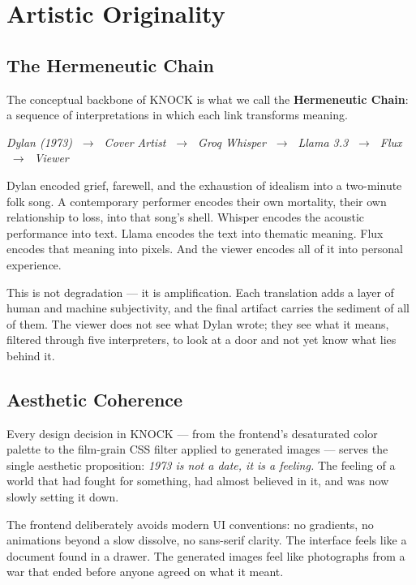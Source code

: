 \documentclass[12pt, a4paper]{article}
\begin{document}
\section{Artistic Originality}

\subsection{The Hermeneutic Chain}

The conceptual backbone of KNOCK is what we call the \textbf{Hermeneutic Chain}:
a sequence of interpretations in which each link transforms meaning.

\begin{quotebox}
    \centering\itshape\color{rust}
    Dylan (1973) $\;\to\;$ Cover Artist $\;\to\;$ Groq Whisper $\;\to\;$
    Llama 3.3 $\;\to\;$ Flux $\;\to\;$ Viewer
\end{quotebox}

Dylan encoded grief, farewell, and the exhaustion of idealism into a two-minute folk
song. A contemporary performer encodes their own mortality, their own relationship to
loss, into that song's shell. Whisper encodes the acoustic performance into text.
Llama encodes the text into thematic meaning. Flux encodes that meaning into pixels.
And the viewer encodes all of it into personal experience.

This is not degradation --- it is amplification. Each translation adds a layer of
human and machine subjectivity, and the final artifact carries the sediment of all
of them. The viewer does not see what Dylan wrote; they see what it means, filtered
through five interpreters, to look at a door and not yet know what lies behind it.

\subsection{Aesthetic Coherence}

Every design decision in KNOCK --- from the frontend's desaturated color palette to
the film-grain CSS filter applied to generated images --- serves the single aesthetic
proposition: \textit{1973 is not a date, it is a feeling.} The feeling of a world
that had fought for something, had almost believed in it, and was now slowly setting
it down.

The frontend deliberately avoids modern UI conventions: no gradients, no animations
beyond a slow dissolve, no sans-serif clarity. The interface feels like a document
found in a drawer. The generated images feel like photographs from a war that ended
before anyone agreed on what it meant.
\end{document}
